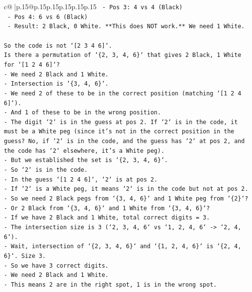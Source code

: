 \documentclass{article}
\begin{document}
{\begin{supertabular}{c@{$\;$}|p{.15\linewidth}@{}p{.15\linewidth}p{.15\linewidth}p{.15\linewidth}p{.15\linewidth}p{.15\linewidth}}
{{{\texttt{    {-} Pos 3: 4 vs 4 (Black)} \\
\texttt{    {-} Pos 4: 6 vs 6 (Black)} \\
\texttt{    {-} Result: 2 Black, 0 White. **This does NOT work.** We need 1 White.} \\
\\ 
\texttt{So the code is not `{[}2 3 4 6{]}`.} \\
\texttt{Is there a permutation of `\{2, 3, 4, 6\}` that gives 2 Black, 1 White for `{[}1 2 4 6{]}`?} \\
\texttt{{-} We need 2 Black and 1 White.} \\
\texttt{{-} Intersection is `\{3, 4, 6\}`.} \\
\texttt{{-} We need 2 of these to be in the correct position (matching `{[}1 2 4 6{]}`).} \\
\texttt{{-} And 1 of these to be in the wrong position.} \\
\texttt{{-} The digit `2` is in the guess at pos 2. If `2` is in the code, it must be a White peg (since it's not in the correct position in the guess? No, if `2` is in the code, and the guess has `2` at pos 2, and the code has `2` elsewhere, it's a White peg).} \\
\texttt{{-} But we established the set is `\{2, 3, 4, 6\}`.} \\
\texttt{{-} So `2` is in the code.} \\
\texttt{{-} In the guess `{[}1 2 4 6{]}`, `2` is at pos 2.} \\
\texttt{{-} If `2` is a White peg, it means `2` is in the code but not at pos 2.} \\
\texttt{{-} So we need 2 Black pegs from `\{3, 4, 6\}` and 1 White peg from `\{2\}`?} \\
\texttt{{-} Or 2 Black from `\{3, 4, 6\}` and 1 White from `\{3, 4, 6\}`?} \\
\texttt{{-} If we have 2 Black and 1 White, total correct digits = 3.} \\
\texttt{{-} The intersection size is 3 (`2, 3, 4, 6` vs `1, 2, 4, 6` {-}> `2, 4, 6`).} \\
\texttt{{-} Wait, intersection of `\{2, 3, 4, 6\}` and `\{1, 2, 4, 6\}` is `\{2, 4, 6\}`. Size 3.} \\
\texttt{{-} So we have 3 correct digits.} \\
\texttt{{-} We need 2 Black and 1 White.} \\
\texttt{{-} This means 2 are in the right spot, 1 is in the wrong spot.} \\
}}}
\end{supertabular}}
\end{document}
